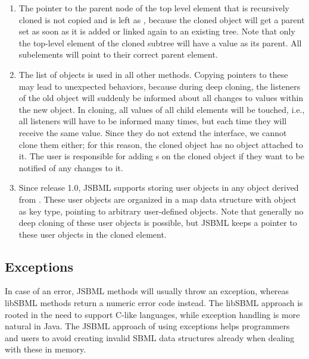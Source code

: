 \begin{enumerate}

\item The pointer to the parent node of the top level element that is
  recursively cloned is not copied and is left as , because the
  cloned object will get a parent set as soon as it is added or linked again
  to an existing tree. Note that only the top-level element of the cloned
  subtree will have a  value as its parent. All subelements will
  point to their correct parent element.

\item The list of \TreeNodeChangeListener objects is used in all other
   methods. Copying pointers to these may lead to
  unexpected behaviors, because during deep cloning, the listeners of
  the old object will suddenly be informed about all changes to values within
  the new object.  In cloning, all values of all child elements
  will be touched, i.e., all listeners will have to be informed many times, but
  each time they will receive the same value. Since they do not
  extend the \Cloneable interface, we cannot clone them either; for this reason, the cloned
  object has no \TreeNodeChangeListener object attached to it. The user is responsible
  for adding \TreeNodeChangeListener{}s on the cloned object if they want to be
  notified of any changes to it.

\item Since release 1.0, JSBML supports storing user objects in any object
  derived from \AbstractTreeNode.  These user objects are organized in a map
  data structure with object as key type, pointing to arbitrary user-defined
  objects. Note that generally no deep cloning of these user objects is
  possible, but JSBML keeps a pointer to these user objects in the cloned
  element.

\end{enumerate}


\subsection{Exceptions}
\label{sec:exceptions}

In case of an error, JSBML  methods will usually throw an
exception, whereas libSBML  methods return a
numeric error code instead. The libSBML approach is rooted in the need to
support C-like languages, while exception handling is more natural in Java.
The JSBML approach of using exceptions helps programmers and users to avoid
creating invalid SBML data structures already when dealing with these in
memory. 

